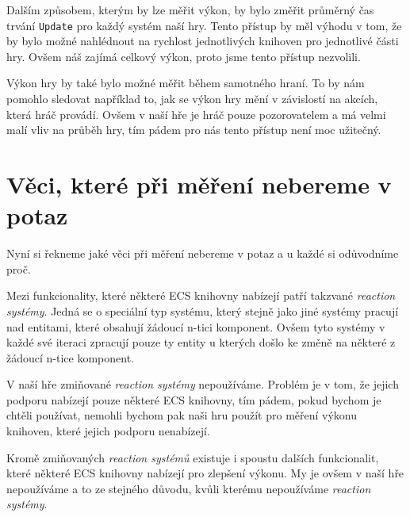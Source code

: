 Dalším způsobem, kterým by lze měřit výkon, by bylo změřit průměrný čas trvání \texttt{Update} pro každý systém naší hry. Tento přístup by měl výhodu v tom, že by bylo možné nahlédnout na rychlost jednotlivých knihoven pro jednotlivé části hry. Ovšem náš zajímá celkový výkon, proto jsme tento přístup nezvolili.

Výkon hry by také bylo možné měřit během samotného hraní. To by nám pomohlo sledovat například to, jak se výkon hry mění v závislostí na akcích, která hráč provádí. Ovšem v naší hře je hráč pouze pozorovatelem a má velmi malí vliv na průběh hry, tím pádem pro nás tento přístup není moc užitečný.

\section{Věci, které při měření nebereme v potaz}
Nyní si řekneme jaké věci při měření nebereme v potaz a u každé si odůvodníme proč.

Mezi funkcionality, které některé ECS knihovny nabízejí patří takzvané \textit{reaction systémy}. Jedná se o speciální typ systému, který stejně jako jiné systémy pracují nad entitami, které obsahují žádoucí n-tici komponent. Ovšem tyto systémy v každé své iteraci zpracují pouze ty entity u kterých došlo ke změně na některé z žádoucí n-tice komponent.

V naší hře zmiňované \textit{reaction systémy} nepoužíváme. Problém je v tom, že jejich podporu nabízejí pouze některé ECS knihovny, tím pádem, pokud bychom je chtěli používat, nemohli bychom pak naši hru použít pro měření výkonu knihoven, které jejich podporu nenabízejí.

Kromě zmiňovaných \textit{reaction systémů} existuje i spoustu dalších funkcionalit, které některé ECS knihovny nabízejí pro zlepšení výkonu. My je ovšem v naší hře nepoužíváme a to ze stejného důvodu, kvůli kterému nepoužíváme \textit{reaction systémy}.

















